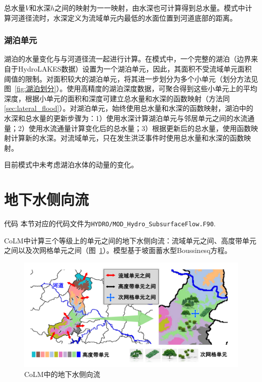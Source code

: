 总水量$V$和水深$h$之间的映射为一一映射，由水深也可计算得到总水量。模式中计算河道径流时，水深定义为流域单元内最低的水面位置到河道底部的距离。

\subsubsection{湖泊单元}
湖泊的水量变化与与河道径流一起进行计算。在模式中，一个完整的湖泊（边界来自于HydroLAKES数据）设置为一个湖泊单元，因此，其面积不受流域单元面积阈值的限制。对面积较大的湖泊单元，将其进一步划分为多个小单元（划分方法见图~\ref{fig:湖泊划分}）。使用高精度的湖泊深度数据，可聚合得到这些小单元上的平均深度，根据小单元的面积和深度可建立总水量和水深的函数映射（方法同\ref{sec:lateral_flood}）。对湖泊单元，始终使用总水量和水深的函数映射，湖泊中的水深和总水量的更新步骤为：1）使用水深计算湖泊单元与邻居单元之间的水流通量；2）使用水流通量计算变化后的总水量；3）根据更新后的总水量，使用函数映射计算新的水深。对流域单元，只在发生洪泛事件时使用总水量和水深的函数映射。

目前模式中未考虑湖泊水体的动量的变化。

\section{地下水侧向流}

\begin{mymdframed}{代码}
本节对应的代码文件为\texttt{HYDRO/MOD\_Hydro\_SubsurfaceFlow.F90}.
\end{mymdframed}

CoLM中计算三个等级上的单元之间的地下水侧向流：流域单元之间、高度带单元之间以及次网格单元之间（图~\ref{fig:地下水侧向流}）。模型基于坡面蓄水型Boussinesq方程。

{
\begin{figure}[htbp]
\centering
\includegraphics[width=\textwidth]{Figures/侧向流/地下水侧向流.pdf}
\caption{CoLM中的地下水侧向流}
\label{fig:地下水侧向流}
\end{figure}
}


